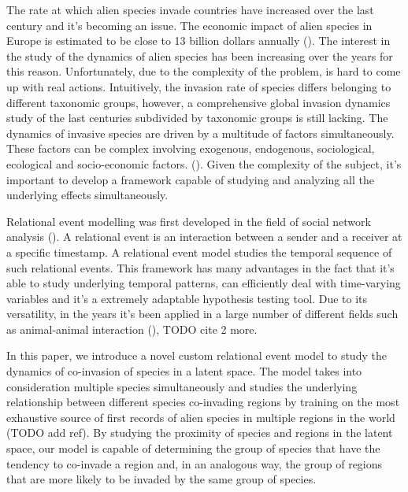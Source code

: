 \documentclass[mscthesis]{usiinfthesis}
\begin{document}
The rate at which alien species invade countries have increased over the last century and it's becoming an issue. The economic impact of alien species in Europe is estimated to be close to 13 billion dollars annually (\citet{intro:rate}). The interest in the study of the dynamics of alien species has been increasing over the years for this reason. Unfortunately, due to the complexity of the problem, is hard to come up with real actions. Intuitively, the invasion rate of species differs belonging to different taxonomic groups, however, a comprehensive global invasion dynamics study of the last centuries subdivided by taxonomic groups is still lacking. The dynamics of invasive species are driven by a multitude of factors simultaneously. These factors can be complex involving exogenous, endogenous, sociological, ecological and socio-economic factors. (\citet{intro:factors}). Given the complexity of the subject, it's important to develop a framework capable of studying and analyzing all the underlying effects simultaneously. 

Relational event modelling was first developed in the field of social network analysis (\citet{rem:butts}). A relational event is an interaction between a sender and a receiver at a specific timestamp. A relational event model studies the temporal sequence of such relational events. This framework has many advantages in the fact that it's able to study underlying temporal patterns, can efficiently deal with time-varying variables and it's a extremely adaptable hypothesis testing tool. Due to its versatility, in the years it's been applied in a large number of different fields such as animal-animal interaction (\citet{intro:cattle}), TODO cite 2 more.

%

In this paper, we introduce a novel custom relational event model to study the dynamics of co-invasion of species in a latent space. The model takes into consideration multiple species simultaneously and studies the underlying relationship between different species co-invading regions by training on the most exhaustive source of first records of alien species in multiple regions in the world (TODO add ref). By studying the proximity of species and regions in the latent space, our model is capable of determining the group of species that have the tendency to co-invade a region and, in an analogous way, the group of regions that are more likely to be invaded by the same group of species.
\end{document}
